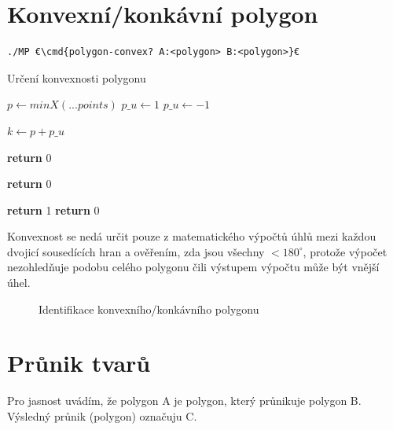 \documentclass[a4paper,12pt]{report}
\newcommand{\cmd}[1]{\textcolor{blue}{\textbf{#1}}}
\begin{document}
\pagebreak

\section{Konvexní/konkávní polygon}
\begin{lstlisting}
./MP €\cmd{polygon-convex? A:<polygon> B:<polygon>}€
\end{lstlisting}





\begin{multicols}{2}
\begin{algorithm}[H]
\caption{Určení konvexnosti polygonu}\label{konvexni/konkavni}
\begin{algorithmic}

\State $p \gets minX(...points)$ 
	\State $p\_u \gets 1$
\Else
	\State $p\_u \gets -1$
\EndIf

\State $k \gets p+p\_u$

		\State \textbf{return} 0
	\EndIf
\EndWhile

		\State \textbf{return} 0
	\EndIf
\EndWhile

	\State \textbf{return} 1
\EndIf
\State \textbf{return} 0
\end{algorithmic}
\end{algorithm}



\noindent Konvexnost se nedá určit pouze z matematického výpočtů úhlů mezi každou dvojicí sousedících hran a ověřením, zda jsou všechny $<180^\circ$, protože výpočet nezohledňuje podobu celého polygonu čili výstupem výpočtu může být vnější úhel.

 \begin{figure}[H]
  \centering
  
  \caption{Identifikace konvexního/konkávního polygonu}
\end{figure}

\end{multicols}


\section{Průnik tvarů}
Pro jasnost uvádím, že polygon A je polygon, který průnikuje polygon B. Výsledný průnik (polygon) označuju C.
\end{document}
